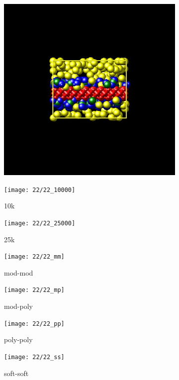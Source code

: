 \documentclass[a4paper]{article}
\begin{document}
\begin{figure}[H]
\begin{subfigure}{0.3\textwidth}
  \centering
  \includegraphics[width=\linewidth,keepaspectratio]{start}
  \caption{}
\end{subfigure}
\begin{subfigure}{0.3\textwidth}
  \centering
  \texttt{[image: 22/22\_10000]}
  \caption{10k}
\end{subfigure}
\begin{subfigure}{0.3\textwidth}
  \centering
  \texttt{[image: 22/22\_25000]}
  \caption{25k}
\end{subfigure}
\caption{}
\label{fig_1}
\end{figure}

\begin{figure}[H]
\begin{subfigure}{0.24\textwidth}
  \centering
  \texttt{[image: 22/22\_mm]}
  \caption{mod-mod}
\end{subfigure}
\begin{subfigure}{0.24\textwidth}
  \centering
  \texttt{[image: 22/22\_mp]}
  \caption{mod-poly}
\end{subfigure}
\begin{subfigure}{0.24\textwidth}
  \centering
  \texttt{[image: 22/22\_pp]}
  \caption{poly-poly}
\end{subfigure}
\begin{subfigure}{0.24\textwidth}
  \centering
  \texttt{[image: 22/22\_ss]}
  \caption{soft-soft}
\end{subfigure}
\caption{}
\label{fig_1}
\end{figure}
\end{document}

